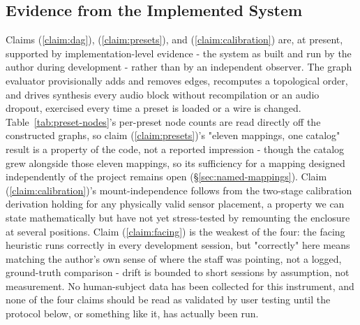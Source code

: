 \documentclass[sigconf,nonacm]{acmart}
\begin{document}
\subsection{Evidence from the Implemented System}
Claims (\ref{claim:dag}), (\ref{claim:presets}), and (\ref{claim:calibration}) are, at present, supported by implementation-level
evidence - the system as built and run by the author during development - rather than by an
independent observer. The graph evaluator provisionally adds and removes edges, recomputes a
topological order, and drives synthesis every audio block without recompilation or an audio dropout,
exercised every time a preset is loaded or a wire is changed. Table~\ref{tab:preset-nodes}'s per-preset node counts are
read directly off the constructed graphs, so claim (\ref{claim:presets})'s "eleven mappings, one catalog" result is a
property of the code, not a reported impression - though the catalog grew alongside those eleven
mappings, so its sufficiency for a mapping designed independently of the project remains open
(\S\ref{sec:named-mappings}). Claim (\ref{claim:calibration})'s mount-independence follows from the two-stage calibration
derivation holding for any physically valid sensor placement, a property we can state
mathematically but have not yet stress-tested by remounting the enclosure at several positions.
Claim (\ref{claim:facing}) is the weakest of the four: the facing heuristic runs correctly in every development
session, but "correctly" here means matching the author's own sense of where the staff was
pointing, not a logged, ground-truth comparison - drift is bounded to short sessions by assumption,
not measurement. No human-subject data has been collected for this instrument, and none of the four
claims should be read as validated by user testing until the protocol below, or something like it,
has actually been run.
\end{document}
